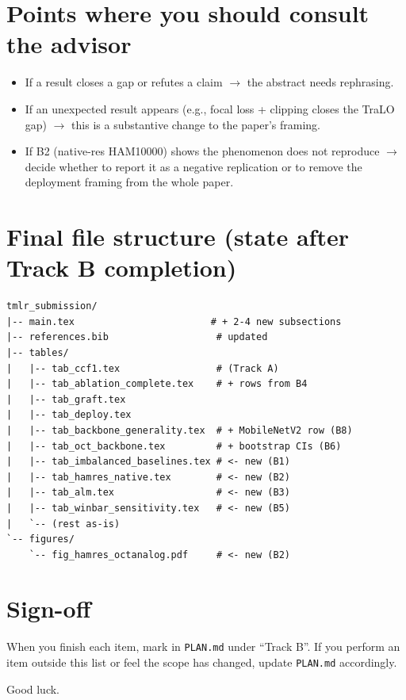 \documentclass[11pt,a4paper]{article}
\newcommand{\file}[1]{\texttt{#1}}
\begin{document}
\section{Points where you should consult the advisor}

\begin{itemize}[nosep]
  \item If a result closes a gap or refutes a claim $\to$ the abstract
        needs rephrasing.
  \item If an unexpected result appears (e.g., focal loss + clipping
        closes the TraLO gap) $\to$ this is a substantive change to the
        paper's framing.
  \item If B2 (native-res HAM10000) shows the phenomenon does not
        reproduce $\to$ decide whether to report it as a negative
        replication or to remove the deployment framing from the whole
        paper.
\end{itemize}

\section{Final file structure (state after Track B completion)}

\begin{lstlisting}
tmlr_submission/
|-- main.tex                        # + 2-4 new subsections
|-- references.bib                   # updated
|-- tables/
|   |-- tab_ccf1.tex                 # (Track A)
|   |-- tab_ablation_complete.tex    # + rows from B4
|   |-- tab_graft.tex
|   |-- tab_deploy.tex
|   |-- tab_backbone_generality.tex  # + MobileNetV2 row (B8)
|   |-- tab_oct_backbone.tex         # + bootstrap CIs (B6)
|   |-- tab_imbalanced_baselines.tex # <- new (B1)
|   |-- tab_hamres_native.tex        # <- new (B2)
|   |-- tab_alm.tex                  # <- new (B3)
|   |-- tab_winbar_sensitivity.tex   # <- new (B5)
|   `-- (rest as-is)
`-- figures/
    `-- fig_hamres_octanalog.pdf     # <- new (B2)
\end{lstlisting}

\section*{Sign-off}

When you finish each item, mark \checkmark in \file{PLAN.md} under
``Track B''. If you perform an item outside this list or feel the scope
has changed, update \file{PLAN.md} accordingly.

Good luck.
\end{document}
